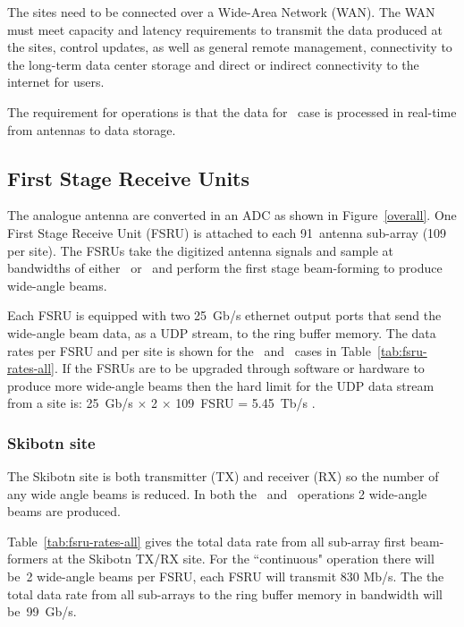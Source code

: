 \documentclass[12pt,a4paper]{article}
\begin{document}
The \ED sites need to be connected over a Wide-Area Network (WAN).
The WAN must meet capacity and latency requirements to transmit the data produced at the \ED sites, control updates, as well as general remote management, connectivity to the long-term data center storage and direct or indirect connectivity to the internet for users.

The requirement for \ED operations is that the data for \NBW\ case is processed in real-time from antennas to data storage.

\subsection{First Stage Receive Units}
\label{ssec:fsru}
The analogue antenna are converted in an ADC as shown in Figure~\ref{overall}.
One First Stage Receive Unit (FSRU) is attached to each 91~antenna sub-array (109 per site).
The FSRUs take the digitized antenna signals and sample at bandwidths of either \NBW\ or \WBW\ and perform the first stage beam-forming to produce wide-angle beams.

Each FSRU is equipped with two 25~Gb/s ethernet output ports that send the wide-angle beam data, as a UDP stream, to the ring buffer memory.
The data rates per FSRU and per site is shown for the \NBW\ and \WBW\ cases in Table~\ref{tab:fsru-rates-all}.
If the FSRUs are to be upgraded through software or hardware to produce more wide-angle beams then the hard limit for the UDP data stream from a site is: 
25~Gb/s $\times$ 2 $\times$ 109~FSRU = 5.45~Tb/s
.

\subsubsection{Skibotn site}
The Skibotn site is both transmitter (TX) and receiver (RX) so the number of any wide angle beams is reduced.
In both the \NBW\ and \WBW\ operations 2 wide-angle beams are produced.

Table~\ref{tab:fsru-rates-all} gives the total data rate from all sub-array first beam-formers at the Skibotn TX/RX site.
For the \NBW{} ``continuous" operation there will be~2 wide-angle beams per FSRU,  each FSRU will transmit 830 Mb/s.
The the total data rate from all sub-arrays to the ring buffer memory in \NBW{} bandwidth will be~99~Gb/s.
\end{document}
